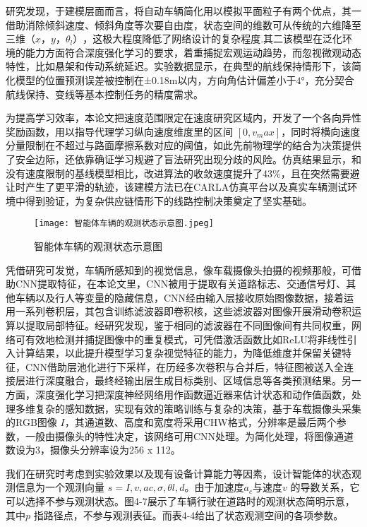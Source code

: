研究发现，于建模层面而言，将自动车辆简化用以模拟平面粒子有两个优点，其一借助消除倾斜速度、倾斜角度等次要自由度，状态空间的维数可从传统的六维降至三维\(（x，y，θ_l）\)，这极大程度降低了网络设计的复杂程度.其二该模型在泛化环境的能力方面符合深度强化学习的要求，着重捕捉宏观运动趋势，而忽视微观动态特性，比如悬架和传动系统延迟。实验数据显示，在典型的航线保持情形下，该简化模型的位置预测误差被控制在±0.18m以内，方向角估计偏差小于\(4°\)，充分契合航线保持、变线等基本控制任务的精度需求。

为提高学习效率，本论文把速度范围限定在速度研究区域内，开发了一个各向异性奖励函数，用以指导代理学习纵向速度维度里的区间 \([0, v_max]\)，同时将横向速度分量限制在不超过与路面摩擦系数对应的阈值，如此先前物理学的结合为决策提供了安全边际，还依靠确证学习规避了盲法研究出现分歧的风险。仿真结果显示，和没有速度限制的基线模型相比，改进算法的收敛速度提升了43\%，且在突然需要避让时产生了更平滑的轨迹，该建模方法已在CARLA仿真平台以及真实车辆测试环境中得到验证，为复杂供应链情形下的线路控制决策奠定了坚实基础。

\begin{figure}[hbt]
	\centering
	\texttt{[image: 智能体车辆的观测状态示意图.jpeg]}
	\caption{智能体车辆的观测状态示意图}
	\label{f.example}
\end{figure}

凭借研究可发觉，车辆所感知到的视觉信息，像车载摄像头拍摄的视频那般，可借助CNN提取特征，在本论文里，CNN被用于提取有关道路标志、交通信号灯、其他车辆以及行人等变量的隐藏信息，CNN经由输入层接收原始图像数据，接着运用一系列卷积层，其包含训练滤波器即卷积核，这些滤波器对图像开展滑动卷积运算以提取局部特征。经研究发现，鉴于相同的滤波器在不同图像间有共同权重，网络可有效地检测并捕捉图像中的重复模式，可凭借激活函数比如ReLU将非线性引入计算结果，以此提升模型学习复杂视觉特征的能力，为降低维度并保留关键特征，CNN借助层池化进行下采样，在历经多次卷积与合并后，特征图被送入全连接层进行深度融合，最终经输出层生成目标类别、区域信息等各类预测结果。另一方面，深度强化学习把深度神经网络用作函数逼近器来估计状态和动作值函数，处理多维复杂的感知数据，实现有效的策略训练与复杂的决策，基于车载摄像头采集的RGB图像 \(𝐼\)，其通道数、高度和宽度将采用CHW格式，分辨率是最后两个参数，一般由摄像头的特性决定，该网络可用CNN处理。为简化处理，将图像通道数设为3，摄像头分辨率设为256 x 112。

我们在研究时考虑到实验效果以及现有设备计算能力等因素，设计智能体的状态观测信息为一个观测向量 \(s = {𝐼, 𝑣, 𝑎𝑐, 𝜎, 𝜃𝑙, 𝑑}\)。由于加速度\(𝑎_𝑐\)与速度\(𝑣\) 的导数关系，它可以选择不参与观测状态。图4-7展示了车辆行驶在道路时的观测状态简明示意，其中\(𝑝\) 指路径点，不参与观测表征。而表4-4给出了状态观测空间的各项参数。


